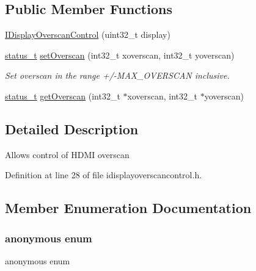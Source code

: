 \subsection*{Public Member Functions}
\begin{DoxyCompactItemize}
\item 
\mbox{\hyperlink{classhwcomposer_1_1IDisplayOverscanControl_aa8f9a4f4ad30a0b07a1123d7dc16150e}{I\+Display\+Overscan\+Control}} (uint32\+\_\+t display)
\item 
\mbox{\hyperlink{hwcserviceapi_8h_a3806fb2027d9a316d8ca8d9b8b8eb96f}{status\+\_\+t}} \mbox{\hyperlink{classhwcomposer_1_1IDisplayOverscanControl_ae337988f284dbbf6844c814203d44d60}{set\+Overscan}} (int32\+\_\+t xoverscan, int32\+\_\+t yoverscan)
\begin{DoxyCompactList}\small\item\em Set overscan in the range +/-\/M\+A\+X\+\_\+\+O\+V\+E\+R\+S\+C\+AN inclusive. \end{DoxyCompactList}\item 
\mbox{\hyperlink{hwcserviceapi_8h_a3806fb2027d9a316d8ca8d9b8b8eb96f}{status\+\_\+t}} \mbox{\hyperlink{classhwcomposer_1_1IDisplayOverscanControl_a4617995aa4f6a5905eee9a0f8a3de3a6}{get\+Overscan}} (int32\+\_\+t $\ast$xoverscan, int32\+\_\+t $\ast$yoverscan)
\end{DoxyCompactItemize}


\subsection{Detailed Description}
Allows control of H\+D\+MI overscan 

Definition at line 28 of file idisplayoverscancontrol.\+h.



\subsection{Member Enumeration Documentation}
\mbox{\label{classhwcomposer_1_1IDisplayOverscanControl_a864e169f204e86500afef542b1486b60}} 
\subsubsection{\texorpdfstring{anonymous enum}{anonymous enum}}
{\footnotesize\ttfamily anonymous enum}

